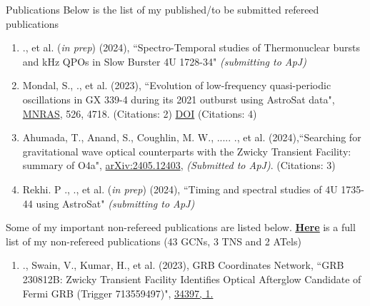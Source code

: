 \begin{section}{Publications}
    Below is the list of my published/to be submitted refereed publications
    \vspace{-0.3em}
    \begin{enumerate}
        \item \me., et al. (\textit{in prep}) (2024), {``Spectro-Temporal studies of Thermonuclear bursts and kHz QPOs in Slow Burster 4U 1728-34"} \textit{(submitting to ApJ)}
        \vspace{-0.2em}

        \item Mondal, S., \me., et al. (2023), {``Evolution of low-frequency quasi-periodic oscillations in GX 339-4 during its 2021 outburst using AstroSat data"}, \href{https://ui.adsabs.harvard.edu/link_gateway/2023MNRAS.526.4718M/doi:10.1093/mnras/stad3079}{MNRAS}, 526, 4718. (Citations: 2) {\href{https://doi.org/10.1093/mnras/stad3079}{DOI}} (Citations: 4)
        \vspace{-0.2em}

        \item Ahumada, T., Anand, S., Coughlin, M. W., ..... \me ., et al. (2024),{``Searching for gravitational wave optical counterparts with the Zwicky Transient Facility: summary of O4a"}, \href{https://arxiv.org/pdf/2405.12403}{arXiv:2405.12403}, \textit{(Submitted to ApJ)}. (Citations: 3)
        \vspace{-0.2em}

        \item Rekhi. P ., \me., et al. (\textit{in prep}) (2024), {``Timing and spectral studies of 4U 1735-44 using AstroSat"} \textit{(submitting to ApJ)}
        \vspace{-0.2em}
    \end{enumerate}

    Some of my important non-refereed publications are listed below. \href{https://ui.adsabs.harvard.edu/search/filter_database_fq_database=AND&filter_database_fq_database=database%3A%22astronomy%22&filter_property_fq_property=AND&filter_property_fq_property=property%3A%22notrefereed%22&fq=%7B!type%3Daqp%20v%3D%24fq_database%7D&fq=%7B!type%3Daqp%20v%3D%24fq_property%7D&fq_database=(database%3A%22astronomy%22)&fq_property=(property%3A%22notrefereed%22)&p_=0&q=Anirudh%20Salgundi&sort=date%20desc%2C%20bibcode%20desc}{\textbf{\underline{\textcolor{navyblue}{Here}}}} is a full list of my non-refereed publications (43 GCNs, 3 TNS and 2 ATels)

    \begin{enumerate}
        \item \me., Swain, V., Kumar, H., et al. (2023), GRB Coordinates Network, {``GRB 230812B: Zwicky Transient Facility Identifies Optical Afterglow Candidate of Fermi GRB (Trigger 713559497)"}, \href{https://gcn.nasa.gov/circulars/34397}{34397, 1.}
        \vspace{-0.2em}


\end{enumerate}
\end{section}
